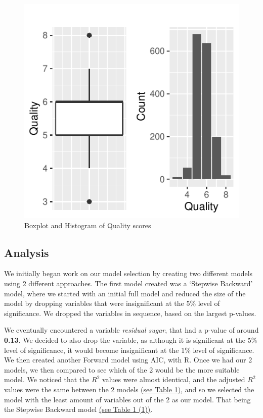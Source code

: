 \documentclass[a4paper,9pt,twocolumn,twoside,]{pinp}
\begin{document}
\begin{figure}

{\centering \includegraphics{Executive-Summary_files/figure-latex/figex-1} 

}

\caption{Boxplot and Histogram of Quality scores}\label{fig:figex}
\end{figure}

\hypertarget{analysis}{%
\subsection{Analysis}\label{analysis}}

We initially began work on our model selection by creating two different
models using 2 different approaches. The first model created was a
`Stepwise Backward' model, where we started with an initial full model
and reduced the size of the model by dropping variables that were
insignificant at the 5\% level of significance. We dropped the variables
in sequence, based on the largest p-values.

We eventually encountered a variable \emph{residual sugar}, that had a
p-value of around \textbf{0.13}. We decided to also drop the variable,
as although it is significant at the 5\% level of significance, it would
become insignificant at the 1\% level of significance. We then created
another Forward model using AIC, with R. Once we had our 2 models, we
then compared to see which of the 2 would be the more suitable model. We
noticed that the \(R^2\) values were almost identical, and the adjusted
\(R^2\) values were the same between the 2 models
\hyperref[table-1]{(see Table 1)}, and so we selected the model with the
least amount of variables out of the 2 as our model. That being the
Stepwise Backward model \hyperref[table-1]{(see Table 1 (1))}.
\end{document}
